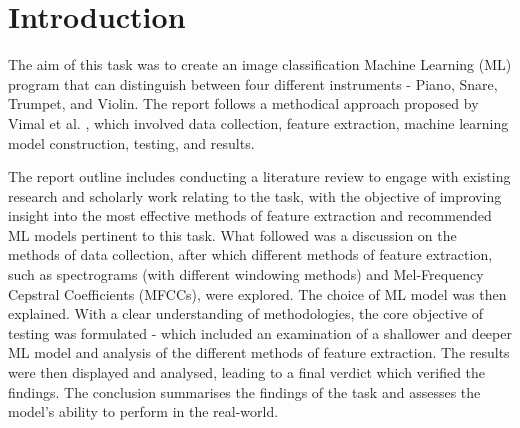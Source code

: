 \documentclass[class=report,11pt,crop=false]{standalone}
\begin{document}
\ifstandalone
\tableofcontents
\fi
\section{Introduction}

The aim of this task was to create an image classification Machine Learning (ML) program that can distinguish between four different instruments - Piano, Snare, Trumpet, and Violin. The report follows a methodical approach proposed by Vimal et al. \cite{Vimal_2021}, which involved data collection, feature extraction, machine learning model construction, testing, and results.

The report outline includes conducting a literature review to engage with existing research and scholarly work relating to the task, with the objective of improving insight into the most effective methods of feature extraction and recommended ML models pertinent to this task. What followed was a discussion on the methods of data collection, after which different methods of feature extraction, such as spectrograms (with different windowing methods) and Mel-Frequency Cepstral Coefficients (MFCCs), were explored. The choice of ML model was then explained. With a clear understanding of methodologies, the core objective of testing was formulated - which included an examination of a shallower and deeper ML model and analysis of the different methods of feature extraction. The results were then displayed and analysed, leading to a final verdict which verified the findings. The conclusion summarises the findings of the task and assesses the model's ability to perform in the real-world.

\ifstandalone

\printnoidxglossary[type=\acronymtype,nonumberlist]
\fi
\end{document}

